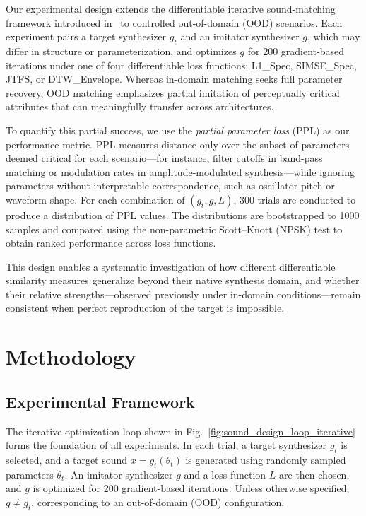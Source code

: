 \documentclass[14pt]{extarticle} %
\providecommand{\gls}[1]{#1}
\begin{document}
Our experimental design extends the differentiable iterative sound-matching framework introduced in~\cite{salimi2025evaluating} to controlled out-of-domain (OOD) scenarios.  
Each experiment pairs a target synthesizer $g_t$ and an imitator synthesizer $g$, which may differ in structure or parameterization, and optimizes $g$ for 200 gradient-based iterations under one of four differentiable loss functions: L1\_Spec, SIMSE\_Spec, JTFS, or DTW\_Envelope.  
Whereas in-domain matching seeks full parameter recovery, OOD matching emphasizes partial imitation of perceptually critical attributes that can meaningfully transfer across architectures.  

To quantify this partial success, we use the \textit{partial parameter loss} (PPL) as our performance metric.  
PPL measures distance only over the subset of parameters deemed critical for each scenario—for instance, filter cutoffs in band-pass matching or modulation rates in amplitude-modulated synthesis—while ignoring parameters without interpretable correspondence, such as oscillator pitch or waveform shape.  
For each combination of $(g_t, g, L)$, 300 trials are conducted to produce a distribution of PPL values.  
The distributions are bootstrapped to 1000 samples and compared using the non-parametric Scott–Knott (\gls{NPSK}) test to obtain ranked performance across loss functions.  

This design enables a systematic investigation of how different differentiable similarity measures generalize beyond their native synthesis domain, and whether their relative strengths—observed previously under in-domain conditions—remain consistent when perfect reproduction of the target is impossible.

 \section{Methodology}
\label{sec:experiment_setup}

\subsection{Experimental Framework}
The iterative optimization loop shown in Fig.~\ref{fig:sound_design_loop_iterative} forms the foundation of all experiments.  
In each trial, a target synthesizer $g_t$ is selected, and a target sound $x = g_t(\theta_t)$ is generated using randomly sampled parameters $\theta_t$.  
An imitator synthesizer $g$ and a loss function $L$ are then chosen, and $g$ is optimized for 200 gradient-based iterations.  
Unless otherwise specified, $g \neq g_t$, corresponding to an out-of-domain (OOD) configuration.
\end{document}
